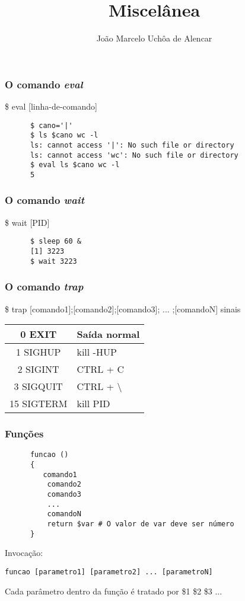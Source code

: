 \documentclass{beamer}
\title{Miscelânea}
\author[João Marcelo Uchôa de Alencar]{João Marcelo Uchôa de Alencar}
\institute{Universidade Federal do Ceará - Quixadá}
\begin{document}
   \begin{frame}
      \titlepage
   \end{frame}

   \begin{frame}[fragile]
      \frametitle{O comando \textit{eval}}
      \$ eval [linha-de-comando] \\
      \begin{verbatim}
      $ cano='|'
      $ ls $cano wc -l
      ls: cannot access '|': No such file or directory
      ls: cannot access 'wc': No such file or directory
      $ eval ls $cano wc -l
      5
      \end{verbatim}
\end{frame}

   \begin{frame}[fragile]
      \frametitle{O comando \textit{wait}}
      \$ wait [PID] \\
      \begin{verbatim}
      $ sleep 60 &
      [1] 3223
      $ wait 3223
      \end{verbatim}
\end{frame}

   \begin{frame}
      \frametitle{O comando \textit{trap}}
      \$ trap [comando1];[comando2];[comando3]; ... ;[comandoN] sinais \\
      \begin{table}
         \begin{tabular}{c|l}
         0 EXIT     & Saída normal \\
         \hline 
         1 SIGHUP   & kill -HUP \\
         \hline 
         2 SIGINT   & CTRL + C \\
         \hline 
         3 SIGQUIT  & CTRL + \textbackslash \\
         \hline 
         15 SIGTERM & kill PID \\
         \hline 
         \end{tabular}
      \end{table}
   \end{frame}

   \begin{frame}[fragile]
      \frametitle{Funções}
      \begin{verbatim}
      funcao ()
      {
         comando1
	      comando2
	      comando3
	      ...
	      comandoN
	      return $var # O valor de var deve ser número
      }
   \end{verbatim}
      Invocação:
      \begin{verbatim}
funcao [parametro1] [parametro2] ... [parametroN] 
      \end{verbatim}
      Cada parâmetro dentro da função é tratado por \$1 \$2 \$3 ...
\end{frame}
\end{document}
